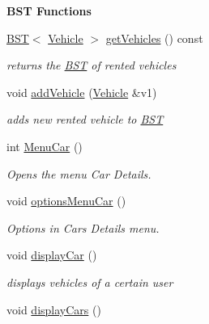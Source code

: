 \begin{Indent}\textbf{ B\+ST Functions}\par
\begin{DoxyCompactItemize}
\item 
\hyperlink{class_b_s_t}{B\+ST}$<$ \hyperlink{class_vehicle}{Vehicle} $>$ \hyperlink{class_agency_af7b06f6c289c6c6a7acf09dda8a6f7d5}{get\+Vehicles} () const
\begin{DoxyCompactList}\small\item\em returns the \hyperlink{class_b_s_t}{B\+ST} of rented vehicles \end{DoxyCompactList}\item 
void \hyperlink{class_agency_ab2a08b75fbe909173d539d27a06c7bc9}{add\+Vehicle} (\hyperlink{class_vehicle}{Vehicle} \&v1)
\begin{DoxyCompactList}\small\item\em adds new rented vehicle to \hyperlink{class_b_s_t}{B\+ST} \end{DoxyCompactList}\item 
\mbox{\label{class_agency_a1273a762d40c0519e9382238341fa579}} 
int \hyperlink{class_agency_a1273a762d40c0519e9382238341fa579}{Menu\+Car} ()
\begin{DoxyCompactList}\small\item\em Opens the menu Car Details. \end{DoxyCompactList}\item 
\mbox{\label{class_agency_aba16b0f3b2db9c70e5a54eef91e0765d}} 
void \hyperlink{class_agency_aba16b0f3b2db9c70e5a54eef91e0765d}{options\+Menu\+Car} ()
\begin{DoxyCompactList}\small\item\em Options in Cars Details menu. \end{DoxyCompactList}\item 
\mbox{\label{class_agency_a9416585f65eeab4b7ac1071d5d4de036}} 
void \hyperlink{class_agency_a9416585f65eeab4b7ac1071d5d4de036}{display\+Car} ()
\begin{DoxyCompactList}\small\item\em displays vehicles of a certain user \end{DoxyCompactList}\item 
\mbox{\label{class_agency_ac6f2e6884260af2dfedb7cd6f3360996}} 
void \hyperlink{class_agency_ac6f2e6884260af2dfedb7cd6f3360996}{display\+Cars} ()

\end{DoxyCompactItemize}
\end{Indent}
